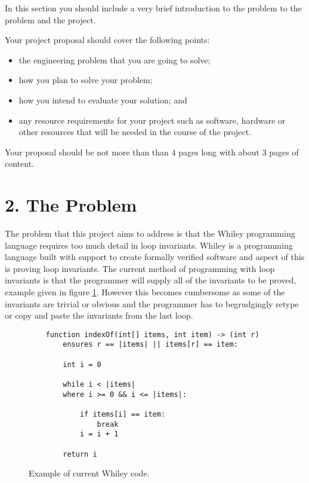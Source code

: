 \documentclass[11pt, a4paper, twoside, openright]{report}
\begin{document}
In this section you should include a very brief introduction to the
problem to the problem and the project.

Your project proposal should cover the following points:

\begin{itemize}
    \item the engineering problem that you are going to solve;
    \item how you plan to solve your problem;
    \item how you intend to evaluate your solution; and
    \item any resource requirements for your project such as software,
        hardware or other resources that will be needed in the course of the
        project.
\end{itemize}


Your proposal should be not more than than 4 pages long with about 3 pages of content.

\section*{2. The Problem}



The problem that this project aims to address is that the Whiley programming language
requires too much detail in loop invariants.
Whiley is a programming language built with support to create formally verified
software and aspect of this is proving loop invariants.
The current method of programming with loop invariants is that the programmer will supply
all of the invariants to be proved, example given in figure \ref{fig:whiley-ex-1}.
However this becomes cumbersome as some of the invariants are trivial or obvious
and the programmer has to begrudgingly retype or copy and paste the invariants
from the last loop.


\begin{figure}[h]
    \begin{lstlisting}
    function indexOf(int[] items, int item) -> (int r)
        ensures r == |items| || items[r] == item:

        int i = 0

        while i < |items|
        where i >= 0 && i <= |items|:

            if items[i] == item:
                break
            i = i + 1

        return i
    \end{lstlisting}
    \caption{Example of current Whiley code.}
    \label{fig:whiley-ex-1}
\end{figure}
\end{document}

